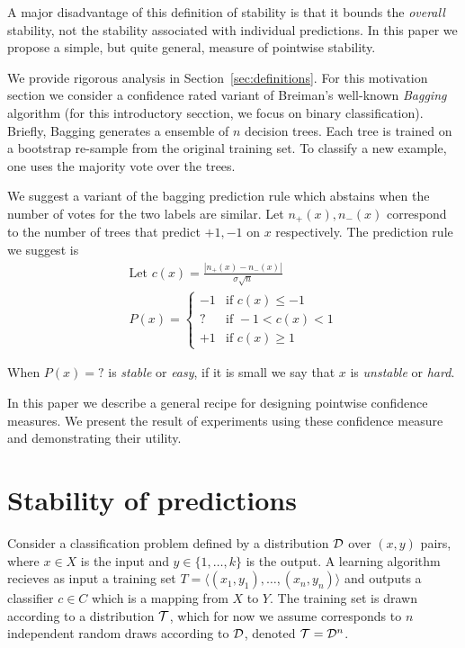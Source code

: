 \documentclass{article}
\begin{document}
A major disadvantage of this definition of stability is that it bounds
the {\em overall} stability, not the stability associated with
individual predictions. In this paper we propose a simple, but quite
general, measure of pointwise stability.
\fi

We provide rigorous analysis in Section~\ref{sec:definitions}. For
this motivation section we consider a confidence rated variant of Breiman's
well-known {\em Bagging}~\cite{breiman1996bagging} algorithm (for this introductory secction, we
focus on binary classification). Briefly, Bagging generates
a ensemble of $n$ decision trees. Each tree is trained on a bootstrap
re-sample from the original training set. To classify a new
example, one uses the majority vote over the trees.

\newcommand{\sign}{\mbox{sign}}
We suggest a variant of the bagging prediction rule which abstains
when the number of votes for the two labels are similar.  Let
$n_+(x),n_-(x)$ correspond to the number of trees that predict $+1,-1$
on $x$ respectively. 
The prediction rule we suggest is
\begin{eqnarray} \label{eqn:baggingWithAbstention}
  \mbox{Let }
  c(x)=\frac{|n_+(x)-n_-(x)|}{\sigma \sqrt{n}}
  \\
  P(x) =
  \begin{cases}
    -1 & \mbox{if } c(x) \leq -1 \\
    ? & \mbox{if }  -1 < c(x) < 1\\
    +1 & \mbox{if } c(x) \geq  1 
  \end{cases}
\end{eqnarray}

When $P(x) = ?$  is {\em stable} or {\em easy}, if it is small we say that
$x$ is {\em unstable} or {\em hard}.

In this paper we describe a general recipe for designing pointwise
confidence measures. We present the result of experiments using these
confidence measure and demonstrating their utility.

\section{Stability of predictions}

Consider a classification problem defined by a distribution ${\cal D}$ over
$(x,y)$ pairs, where $x \in X$ is the input and $y \in \{1,\ldots,k\}$
is the output. A learning algorithm recieves as input a training set
$T=\langle(x_1,y_1),\ldots,(x_n,y_n) \rangle$
and outputs a classifier $c\in C$ which is a mapping from $X$ to
$Y$. The training set is drawn according to a distribution ${\cal T}$,
which for now we assume corresponds to $n$ independent random draws
according to ${\cal D}$, denoted ${\cal T} = {\cal D}^n$.
\end{document}
